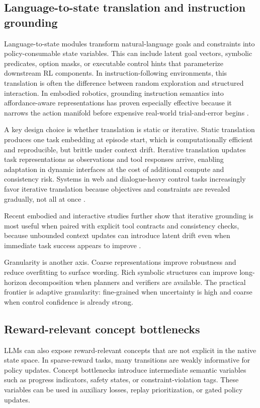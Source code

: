 \documentclass[pdflatex,sn-mathphys-num]{sn-jnl}
\begin{document}
\subsection{Language-to-state translation and instruction grounding}
Language-to-state modules transform natural-language goals and constraints into policy-consumable state variables. This can include latent goal vectors, symbolic predicates, option masks, or executable control hints that parameterize downstream RL components. In instruction-following environments, this translation is often the difference between random exploration and structured interaction. In embodied robotics, grounding instruction semantics into affordance-aware representations has proven especially effective because it narrows the action manifold before expensive real-world trial-and-error begins \cite{arxiv_p_2204_01691,doi_p_10_1109_icra48891_2023_10160591,arxiv_p_2310_17722}.

A key design choice is whether translation is static or iterative. Static translation produces one task embedding at episode start, which is computationally efficient and reproducible, but brittle under context drift. Iterative translation updates task representations as observations and tool responses arrive, enabling adaptation in dynamic interfaces at the cost of additional compute and consistency risk. Systems in web and dialogue-heavy control tasks increasingly favor iterative translation because objectives and constraints are revealed gradually, not all at once \cite{arxiv_p_2311_00262,arxiv_p_2402_19446,arxiv_p_2601_02439}.

Recent embodied and interactive studies further show that iterative grounding is most useful when paired with explicit tool contracts and consistency checks, because unbounded context updates can introduce latent drift even when immediate task success appears to improve \cite{arxiv_p_2404_03648,arxiv_p_2511_14460,arxiv_p_2601_03555}.

Granularity is another axis. Coarse representations improve robustness and reduce overfitting to surface wording. Rich symbolic structures can improve long-horizon decomposition when planners and verifiers are available. The practical frontier is adaptive granularity: fine-grained when uncertainty is high and coarse when control confidence is already strong.

\subsection{Reward-relevant concept bottlenecks}
LLMs can also expose reward-relevant concepts that are not explicit in the native state space. In sparse-reward tasks, many transitions are weakly informative for policy updates. Concept bottlenecks introduce intermediate semantic variables such as progress indicators, safety states, or constraint-violation tags. These variables can be used in auxiliary losses, replay prioritization, or gated policy updates.
\end{document}
